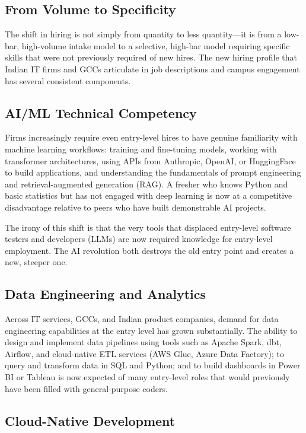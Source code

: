 \documentclass[conference]{IEEEtran}
\begin{document}
\subsection{From Volume to Specificity}

The shift in hiring is not simply from quantity to less quantity---it is from a low-bar, high-volume intake model to a selective, high-bar model requiring specific skills that were not previously required of new hires. The new hiring profile that Indian IT firms and GCCs articulate in job descriptions and campus engagement has several consistent components.

\subsection{AI/ML Technical Competency}

Firms increasingly require even entry-level hires to have genuine familiarity with machine learning workflows: training and fine-tuning models, working with transformer architectures, using APIs from Anthropic, OpenAI, or HuggingFace to build applications, and understanding the fundamentals of prompt engineering and retrieval-augmented generation (RAG). A fresher who knows Python and basic statistics but has not engaged with deep learning is now at a competitive disadvantage relative to peers who have built demonstrable AI projects.

The irony of this shift is that the very tools that displaced entry-level software testers and developers (LLMs) are now required knowledge for entry-level employment. The AI revolution both destroys the old entry point and creates a new, steeper one.

\subsection{Data Engineering and Analytics}

Across IT services, GCCs, and Indian product companies, demand for data engineering capabilities at the entry level has grown substantially. The ability to design and implement data pipelines using tools such as Apache Spark, dbt, Airflow, and cloud-native ETL services (AWS Glue, Azure Data Factory); to query and transform data in SQL and Python; and to build dashboards in Power BI or Tableau is now expected of many entry-level roles that would previously have been filled with general-purpose coders.

\subsection{Cloud-Native Development}
\end{document}
